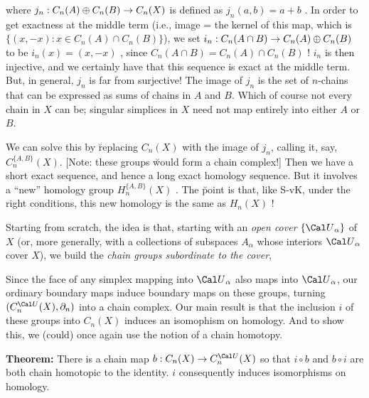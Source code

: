 \ssk


\ssk

where $j_n:C_n(A)\oplus C_n(B) \rightarrow C_n(X)$ is defined as $j_n(a,b)=a+b$ . In order to get exactness
at the middle term (i.e., image = the kernel of this map, which is $\{ (x,-x) : x\in C_n(A)\cap C_n(B)\}$),
we set $i_n:C_n(A\cap B) \rightarrow C_n(A)\oplus C_n(B)$ to be $i_n(x) = (x,-x)$ , since
$C_n(A\cap B) = C_n(A)\cap C_n(B)$ ! $i_n$ is then injective, and we certainly have that
this sequence is exact at the middle term. But, in general, $j_n$ is far from surjective! The image of $j_n$
is the set of $n$-chains that can be expressed as sums of chains in $A$ and $B$. Which of course
not every chain in $X$ can be; singular simplices in $X$ need not map entirely
into either $A$ or $B$. 

\msk

We can solve this by \u{replacing} $C_n(X)$ with the image of $j_n$, calling it, say,
$C_n^{\{A,B\}}(X)$. [Note: these groups \u{would} form a chain complex!]
Then we have a short exact sequence, and hence a long exact homology sequence.
But it involves a ``new'' homology group $H_n^{\{A,B\}}(X)$ . The \u{point} is that, like S-vK,
under the right conditions, this new homology is the same as $H_n(X)$ !

\vfill
\eject

Starting from scratch, the idea is that, starting with an {\it open cover} $\{{\Cal U}_\alpha\}$
of $X$ (or, more generally, with a collections of subspaces $A_\alpha$ whose interiors 
${\Cal U}_\alpha$ cover $X$), we build the {\it chain groups subordinate to the cover},

\ssk

 
\ssk

Since the face of any simplex mapping into ${\Cal U}_\alpha$ also maps into ${\Cal U}_\alpha$,
our ordinary boundary maps induce boundary maps on these groups, turning
$(C_n^{\Cal U}(X),\partial_n)$ into a chain complex. Our main result is that the inclusion
$i$ of these groups into $C_n(X)$ induces an isomophism on homology. And to show this, we (could) once
again use the notion of a chain homotopy.

\ssk

{\bf Theorem:} There is a chain map $b:C_n(X)\ra C_n^{\Cal U}(X)$ so that $i\circ b$ and $b\circ i$ are both chain 
homotopic to the identity. $i$ consequently induces isomorphisms on homology.

